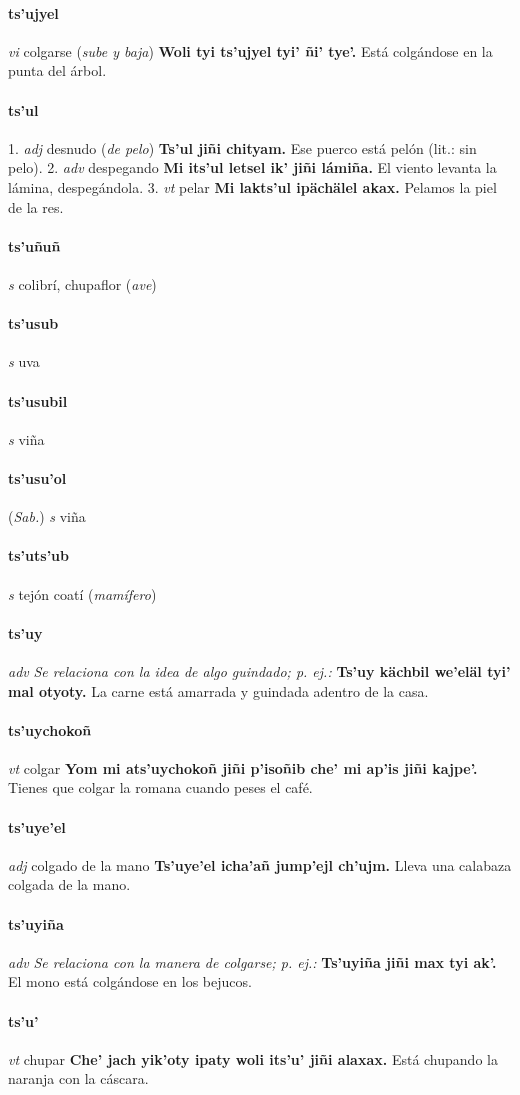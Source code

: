 \documentclass{scrbook}
\newcommand{\entry}[1]{\paragraph{#1}}
\newcommand{\onedefinition}[1]{#1.}
\newcommand{\nontranslationdef}[1]{\textit{#1}}
\newcommand{\partofspeech}[1]{\textit{#1}}
\newcommand{\spanishtranslation}[1]{#1}
\newcommand{\clarification}[1]{(\textit{#1})}
\newcommand{\cholexample}[1]{\textbf{#1}}
\newcommand{\exampletranslation}[1]{#1}
\newcommand{\relevantdialect}[1]{(\textit{#1})}
\begin{document}
\begin{multicols}{2}
\entry{ts'ujyel}
\partofspeech{vi}
\spanishtranslation{colgarse}
\clarification{sube y baja}
\cholexample{Woli tyi ts'ujyel tyi' ñi' tye'.}
\exampletranslation{Está colgándose en la punta del árbol.}

\entry{ts'ul}
\onedefinition{1}
\partofspeech{adj}
\spanishtranslation{desnudo}
\clarification{de pelo}
\cholexample{Ts'ul jiñi chityam.}
\exampletranslation{Ese puerco está pelón (lit.: sin pelo).}
\onedefinition{2}
\partofspeech{adv}
\spanishtranslation{despegando}
\cholexample{Mi its'ul letsel ik' jiñi lámiña.}
\exampletranslation{El viento levanta la lámina, despegándola.}
\onedefinition{3}
\partofspeech{vt}
\spanishtranslation{pelar}
\cholexample{Mi lakts'ul ipächälel akax.}
\exampletranslation{Pelamos la piel de la res.}

\entry{ts'uñuñ}
\partofspeech{s}
\spanishtranslation{colibrí, chupaflor}
\clarification{ave}

\entry{ts'usub}
\partofspeech{s}
\spanishtranslation{uva}

\entry{ts'usubil}
\partofspeech{s}
\spanishtranslation{viña}

\entry{ts'usu'ol}
\relevantdialect{Sab.}
\partofspeech{s}
\spanishtranslation{viña}

\entry{ts'uts'ub}
\partofspeech{s}
\spanishtranslation{tejón}
\spanishtranslation{coatí}
\clarification{mamífero}

\entry{ts'uy}
\partofspeech{adv}
\nontranslationdef{Se relaciona con la idea de algo guindado; p. ej.:}
\cholexample{Ts'uy kächbil we'eläl tyi' mal otyoty.}
\exampletranslation{La carne está amarrada y guindada adentro de la casa.}

\entry{ts'uychokoñ}
\partofspeech{vt}
\spanishtranslation{colgar}
\cholexample{Yom mi ats'uychokoñ jiñi p'isoñib che' mi ap'is jiñi kajpe'.}
\exampletranslation{Tienes que colgar la romana cuando peses el café.}

\entry{ts'uye'el}
\partofspeech{adj}
\spanishtranslation{colgado de la mano}
\cholexample{Ts'uye'el icha'añ jump'ejl ch'ujm.}
\exampletranslation{Lleva una calabaza colgada de la mano.}

\entry{ts'uyiña}
\partofspeech{adv}
\nontranslationdef{Se relaciona con la manera de colgarse; p. ej.:}
\cholexample{Ts'uyiña jiñi max tyi ak'.}
\exampletranslation{El mono está colgándose en los bejucos.}

\entry{ts'u'}
\partofspeech{vt}
\spanishtranslation{chupar}
\cholexample{Che' jach yik'oty ipaty woli its'u' jiñi alaxax.}
\exampletranslation{Está chupando la naranja con la cáscara.}


\end{multicols}
\end{document}
